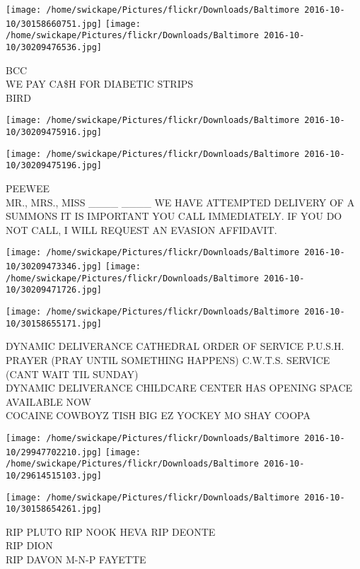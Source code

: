 \documentclass[10pt,letterpaper]{article}
\begin{document}
\vspace{0.25in}
\texttt{[image: /home/swickape/Pictures/flickr/Downloads/Baltimore 2016-10-10/30158660751.jpg]}
\texttt{[image: /home/swickape/Pictures/flickr/Downloads/Baltimore 2016-10-10/30209476536.jpg]}

BCC\\
WE PAY CA\$H FOR DIABETIC STRIPS\\
BIRD
\pagebreak

\texttt{[image: /home/swickape/Pictures/flickr/Downloads/Baltimore 2016-10-10/30209475916.jpg]}

\vspace{0.25in}
\texttt{[image: /home/swickape/Pictures/flickr/Downloads/Baltimore 2016-10-10/30209475196.jpg]}

PEEWEE\\
MR., MRS., MISS \_\_\_\_ \_\_\_\_ WE HAVE ATTEMPTED DELIVERY OF A SUMMONS IT IS IMPORTANT YOU CALL IMMEDIATELY.  IF YOU DO NOT CALL, I WILL REQUEST AN EVASION AFFIDAVIT.
\pagebreak

\texttt{[image: /home/swickape/Pictures/flickr/Downloads/Baltimore 2016-10-10/30209473346.jpg]}
\texttt{[image: /home/swickape/Pictures/flickr/Downloads/Baltimore 2016-10-10/30209471726.jpg]}

\vspace{0.25in}
\texttt{[image: /home/swickape/Pictures/flickr/Downloads/Baltimore 2016-10-10/30158655171.jpg]}

DYNAMIC DELIVERANCE CATHEDRAL ORDER OF SERVICE P.U.S.H. PRAYER (PRAY UNTIL SOMETHING HAPPENS) C.W.T.S. SERVICE (CANT WAIT TIL SUNDAY)\\
DYNAMIC DELIVERANCE CHILDCARE CENTER HAS OPENING  SPACE AVAILABLE NOW\\
COCAINE COWBOYZ TISH BIG EZ YOCKEY MO SHAY COOPA
\pagebreak

\texttt{[image: /home/swickape/Pictures/flickr/Downloads/Baltimore 2016-10-10/29947702210.jpg]}
\texttt{[image: /home/swickape/Pictures/flickr/Downloads/Baltimore 2016-10-10/29614515103.jpg]}

\texttt{[image: /home/swickape/Pictures/flickr/Downloads/Baltimore 2016-10-10/30158654261.jpg]}

RIP PLUTO RIP NOOK HEVA RIP DEONTE\\
RIP DION\\
RIP DAVON M{-}N{-}P FAYETTE
\pagebreak
\end{document}
